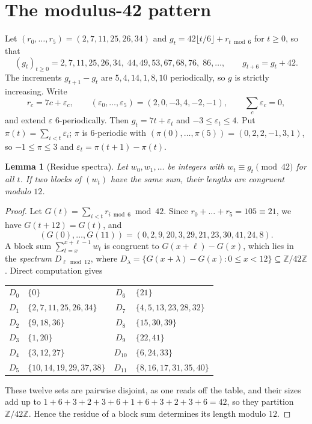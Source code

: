 \documentclass[11pt]{amsart}
\newtheorem{lemma}[theorem]{Lemma}
\theoremstyle{remark}
\newcommand{\Z}{\mathbb{Z}}
\begin{document}
\section{The modulus-42 pattern}\label{sec:mod42}

Let $(r_0,\dots,r_5)=(2,7,11,25,26,34)$ and $g_t=42\lfloor t/6\rfloor+r_{t\bmod6}$ for $t\ge0$, so that
\[
  (g_t)_{t\ge0}=2,7,11,25,26,34,\;44,49,53,67,68,76,\;86,\dots,\qquad g_{t+6}=g_t+42.
\]
The increments $g_{t+1}-g_t$ are $5,4,14,1,8,10$ periodically, so $g$ is strictly increasing. Write
\begin{equation}\label{eq:eps}
  r_c=7c+\varepsilon_c,\qquad (\varepsilon_0,\dots,\varepsilon_5)=(2,0,-3,4,-2,-1),\qquad \sum_c\varepsilon_c=0,
\end{equation}
and extend $\varepsilon$ $6$-periodically. Then $g_t=7t+\varepsilon_t$ and $-3\le\varepsilon_t\le4$. Put
$\pi(t)=\sum_{i<t}\varepsilon_i$; $\pi$ is $6$-periodic with $(\pi(0),\dots,\pi(5))=(0,2,2,-1,3,1)$, so $-1\le\pi\le3$ and
$\varepsilon_t=\pi(t+1)-\pi(t)$.

\begin{lemma}[Residue spectra]\label{lem:spectra}
Let $w_0,w_1,\dots$ be integers with $w_t\equiv g_t\pmod{42}$ for all $t$. If two blocks of $(w_t)$ have the same sum, their lengths are
congruent modulo $12$.
\end{lemma}

\begin{proof}
Let $G(t)=\sum_{i<t}r_{i\bmod6}\bmod 42$. Since $r_0+\dots+r_5=105\equiv21$, we have $G(t+12)=G(t)$, and
\[
  (G(0),\dots,G(11))=(0,2,9,20,3,29,21,23,30,41,24,8).
\]
A block sum $\sum_{t=x}^{x+\ell-1}w_t$ is congruent to $G(x+\ell)-G(x)$, which lies in the \emph{spectrum}
$D_{\ell\bmod12}$, where $D_\lambda=\{G(x+\lambda)-G(x):0\le x<12\}\subseteq\Z/42\Z$. Direct computation gives
\begin{center}
\small
\begin{tabular}{@{}cl@{\qquad}cl@{}}
$D_0$ & $\{0\}$ & $D_6$ & $\{21\}$\\
$D_1$ & $\{2,7,11,25,26,34\}$ & $D_7$ & $\{4,5,13,23,28,32\}$\\
$D_2$ & $\{9,18,36\}$ & $D_8$ & $\{15,30,39\}$\\
$D_3$ & $\{1,20\}$ & $D_9$ & $\{22,41\}$\\
$D_4$ & $\{3,12,27\}$ & $D_{10}$ & $\{6,24,33\}$\\
$D_5$ & $\{10,14,19,29,37,38\}$ & $D_{11}$ & $\{8,16,17,31,35,40\}$
\end{tabular}
\end{center}
These twelve sets are pairwise disjoint, as one reads off the table, and their sizes add up to $1+6+3+2+3+6+1+6+3+2+3+6=42$, so they
partition $\Z/42\Z$. Hence the residue of a block sum determines its length modulo $12$.
\end{proof}
\end{document}
